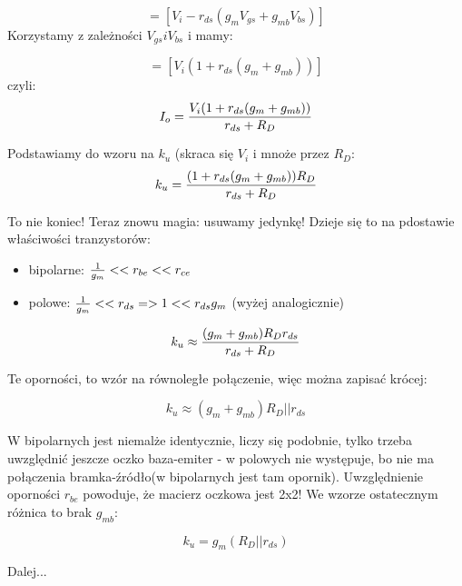 \documentclass[10pt,a4paper]{article}
\begin{document}
\begin{equation}
[r_{ds} + R_D][i_o]=[V_i - r_{ds}(g_mV_{gs} + g_{mb}V_{bs})]
\end{equation}
Korzystamy z zależności $V_{gs} i V_{bs}$ i mamy:

\begin{equation}
[r_{ds} + R_D][i_o]=[V_i (1 + r_{ds}(g_m + g_{mb}))]
\end{equation}
czyli:\\
\begin{equation}
I_o = {V_i(1+r_{ds}(g_m + g_{mb}))\over r_{ds} + R_D}
\end{equation}

Podstawiamy do wzoru na $k_u$ (skraca się $V_i$ i mnoże przez $R_D$:\\
\begin{equation}
k_u = {(1+r_{ds}(g_m + g_{mb}))R_D\over r_{ds} + R_D}
\end{equation}

To nie koniec! Teraz znowu magia: usuwamy jedynkę! Dzieje się to na pdostawie właściwości tranzystorów:\\
\begin{itemize}
\item bipolarne: ${1 \over g_m }<< r_{be} << r_{ce}$
\item polowe: ${1 \over g_m }<< r_{ds} => 1 << r_{ds}g_m$ (wyżej analogicznie)
\end{itemize}

\begin{equation}
k_u \approx {(g_m + g_{mb})R_Dr_{ds}\over r_{ds} + R_D}
\end{equation}

Te oporności, to wzór na równoległe połączenie, więc można zapisać krócej:

\begin{equation}
k_u \approx {(g_m + g_{mb})R_D || r_{ds}}
\end{equation}

W bipolarnych jest niemalże identycznie, liczy się podobnie, tylko trzeba uwzględnić jeszcze oczko baza-emiter - w polowych nie występuje, bo nie ma połączenia bramka-źródło(w bipolarnych jest tam opornik). Uwzględnienie oporności $r_{be}$ powoduje, że macierz oczkowa jest 2x2! We wzorze ostatecznym różnica to brak $g_{mb}$:

\begin{equation}
k_u = {g_m(R_D || r_{ds})}
\end{equation}

Dalej...
\end{document}

